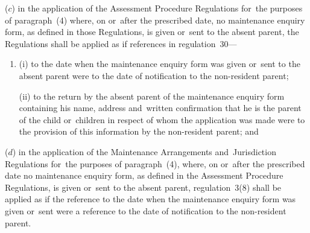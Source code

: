 \documentclass[12pt,a4paper]{article}
\begin{document}
\begin{enumerate}
($c$) in the application of the Assessment Procedure Regulations for~the purposes of paragraph~(4) where, on or~after the prescribed date, no maintenance enquiry form, as defined in those Regulations, is given or~sent to the absent parent, the Regulations shall be applied as if references in regulation~30—
\begin{enumerate}\item[]
(i) to the date when the maintenance enquiry form was given or~sent to the absent parent were to the date of notification to the non-resident parent;

(ii) to the return by the absent parent of the maintenance enquiry form containing his name, address and~written confirmation that he is the parent of the child or~children in respect of whom the application was made were to the provision of this information by the non-resident parent; and
\end{enumerate}

($d$) in the application of the Maintenance Arrangements and~Jurisdiction Regulations for~the purposes of paragraph~(4), where, on or~after the prescribed date no maintenance enquiry form, as defined in the Assessment Procedure Regulations, is given or~sent to the absent parent, regulation~3(8) shall be applied as if the reference to the date when the maintenance enquiry form was given or~sent were a reference to the date of notification to the non-resident parent.
\end{enumerate}


\bigskip
\end{document}

